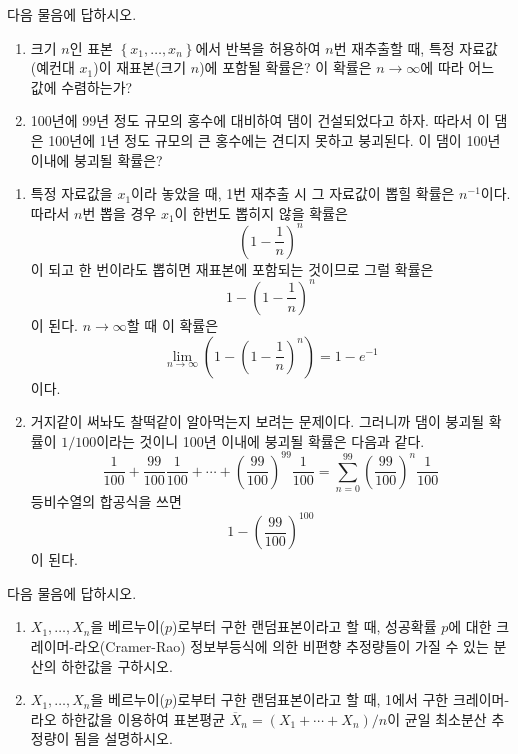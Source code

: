 \documentclass[answers]{exam}
\begin{document}
\newpage
{}
\begin{questions}
   \question
   다음 물음에 답하시오.
   \begin{enumerate}
    \item 크기 $n$인 표본 $\left\{x_{1},\ldots , x_{n} \right\}$에서 반복을 허용하여 $n$번 재추출할 때, 특정 자료값 (예컨대 $x_{1}$)이 재표본(크기 $n$)에 포함될 확률은? 이 확률은 $n\to \infty$에 따라 어느 값에 수렴하는가?
    \item 100년에 99년 정도 규모의 홍수에 대비하여 댐이 건설되었다고 하자. 따라서 이 댐은 100년에 1년 정도 규모의 큰 홍수에는 견디지 못하고 붕괴된다. 이 댐이 100년 이내에 붕괴될 확률은?
   \end{enumerate}
   \begin{solution}
    \begin{enumerate}
      \item 특정 자료값을 $x_{1}$이라 놓았을 때, 1번 재추출 시 그 자료값이 뽑힐 확률은 $n^{-1}$이다. 따라서 $n$번 뽑을 경우 $x_{1}$이 한번도 뽑히지 않을 확률은
      $$
        \left(1-\dfrac{1}{n}\right)^{n}
      $$
      이 되고 한 번이라도 뽑히면 재표본에 포함되는 것이므로 그럴 확률은
      $$
        1-\left(1-\dfrac{1}{n}\right)^{n}
      $$
      이 된다. $n\to\infty$할 때 이 확률은
      $$
        \lim_{n\to\infty}\left(1-\left(1-\dfrac{1}{n}\right)^{n}\right) = 1-e^{-1}
      $$
      이다.
      \item 거지같이 써놔도 찰떡같이 알아먹는지 보려는 문제이다. 그러니까 댐이 붕괴될 확률이 $1/100$이라는 것이니 100년 이내에 붕괴될 확률은 다음과 같다.
      $$
        \dfrac{1}{100} + \dfrac{99}{100}\dfrac{1}{100} + \cdots + \left(\dfrac{99}{100}\right)^{99}\dfrac{1}{100}= \sum_{n=0}^{99}\left(\dfrac{99}{100}\right)^{n}\dfrac{1}{100}
      $$
      등비수열의 합공식을 쓰면
      $$
        1-\left(\dfrac{99}{100}\right)^{100}
      $$
      이 된다.
    \end{enumerate}
   \end{solution}
   \question
   다음 물음에 답하시오.
   \begin{enumerate}
    \item $X_{1},\ldots, X_{n}$을 베르누이($p$)로부터 구한 랜덤표본이라고 할 때, 성공확률 $p$에 대한 크레이머-라오(Cramer-Rao) 정보부등식에 의한 비편향 추정량들이 가질 수 있는 분산의 하한값을 구하시오.
    \item $X_{1},\ldots , X_{n}$을 베르누이($p$)로부터 구한 랜덤표본이라고 할 때, 1에서 구한 크레이머-라오 하한값을 이용하여 표본평균 $\overline{X}_{n}=\left(X_{1}+\cdots +X_{n}\right)/n$이 균일 최소분산 추정량이 됨을 설명하시오.

\end{enumerate}
\end{questions}
\end{document}
